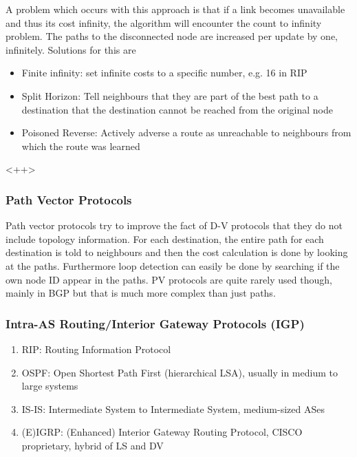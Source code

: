A problem which occurs with this approach is that if a link becomes unavailable and thus its cost infinity, the algorithm will encounter the count to infinity problem.
The paths to the disconnected node are increased per update by one, infinitely.
Solutions for this are
\begin{itemize}
  \item Finite infinity: set infinite costs to a specific number, e.g. 16 in RIP
  \item Split Horizon: Tell neighbours that they are part of the best path to a destination that the destination cannot be reached from the original node
  \item Poisoned Reverse: Actively adverse a route as unreachable to neighbours from which the route was learned
\end{itemize}<++>

\subsubsection*{Path Vector Protocols}
Path vector protocols try to improve the fact of D-V protocols that they do not include topology information.
For each destination, the entire path for each destination is told to neighbours and then the cost calculation is done by looking at the paths.
Furthermore loop detection can easily be done by searching if the own node ID appear in the paths.
PV protocols are quite rarely used though, mainly in BGP but that is much more complex than just paths.

\subsubsection*{Intra-AS Routing/Interior Gateway Protocols (IGP)}
\begin{enumerate}
  \item RIP: Routing Information Protocol
  \item OSPF: Open Shortest Path First (hierarchical LSA), usually in medium to large systems
  \item IS-IS: Intermediate System to Intermediate System, medium-sized ASes
  \item (E)IGRP: (Enhanced) Interior Gateway Routing Protocol, CISCO proprietary, hybrid of LS and DV
\end{enumerate}

